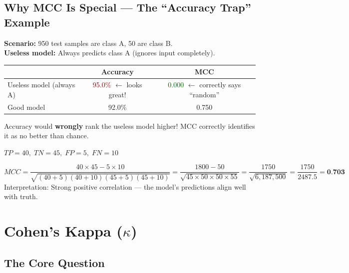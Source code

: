 \documentclass[12pt, a4paper]{article}
\begin{document}
\subsection{Why MCC Is Special --- The ``Accuracy Trap'' Example}

\begin{warningbox}
\textbf{Scenario:} 950 test samples are class A, 50 are class B.\\
\textbf{Useless model:} Always predicts class A (ignores input completely).

\begin{center}
\begin{tabular}{lcc}
\toprule
& \textbf{Accuracy} & \textbf{MCC} \\
\midrule
Useless model (always A) & \textcolor{darkred}{95.0\%} $\leftarrow$ looks great! & \textcolor{darkgreen}{0.000} $\leftarrow$ correctly says ``random'' \\
\midrule
Good model & 92.0\% & 0.750 \\
\bottomrule
\end{tabular}
\end{center}

Accuracy would \textbf{wrongly} rank the useless model higher! MCC correctly identifies it as no better than chance.
\end{warningbox}

\begin{examplebox}
$TP = 40,\; TN = 45,\; FP = 5,\; FN = 10$

\[
MCC = \frac{40 \times 45 - 5 \times 10}{\sqrt{(40+5)(40+10)(45+5)(45+10)}}
= \frac{1800 - 50}{\sqrt{45 \times 50 \times 50 \times 55}}
= \frac{1750}{\sqrt{6{,}187{,}500}}
= \frac{1750}{2487.5}
= \textbf{0.703}
\]
Interpretation: Strong positive correlation --- the model's predictions align well with truth.
\end{examplebox}


\newpage
\section{Cohen's Kappa ($\kappa$)}

\subsection{The Core Question}
\end{document}
